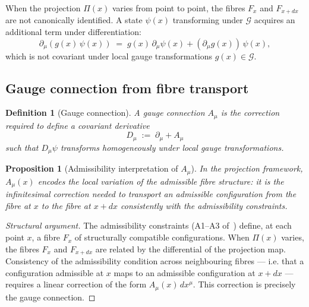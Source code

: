 \documentclass[11pt,a4paper]{article}
\newtheorem{proposition}[theorem]{Proposition}
\newtheorem{definition}[theorem]{Definition}
\begin{document}
      When the projection $\Pi(x)$ varies from point to point, the fibres
      $F_x$ and $F_{x+dx}$ are not canonically identified.
      A state $\psi(x)$ transforming under $\mathcal{G}$ acquires an additional
      term under differentiation:
      \begin{equation}
        \partial_\mu(g(x)\,\psi(x))
        \;=\; g(x)\,\partial_\mu\psi(x) + (\partial_\mu g(x))\,\psi(x),
      \end{equation}
      which is not covariant under local gauge transformations $g(x) \in \mathcal{G}$.

    \subsection{Gauge connection from fibre transport}

      \begin{definition}[Gauge connection]
        \label{def:connection}
        A \emph{gauge connection} $A_\mu$ is the correction required to define a
        covariant derivative
        \begin{equation}
          \label{eq:covariant-derivative}
          D_\mu \;:=\; \partial_\mu + A_\mu
        \end{equation}
        such that $D_\mu\psi$ transforms homogeneously under local gauge
        transformations.
      \end{definition}

      \begin{proposition}[Admissibility interpretation of $A_\mu$]
        \label{prop:connection-admissibility}
        In the projection framework, $A_\mu(x)$ encodes the local variation of the
        admissible fibre structure: it is the infinitesimal correction needed to
        transport an admissible configuration from the fibre at $x$ to the fibre
        at $x + dx$ consistently with the admissibility constraints.
      \end{proposition}

      \begin{proof}[Structural argument]
        The admissibility constraints (A1--A3 of~\cite{FoundationM}) define, at each
        point $x$, a fibre $F_x$ of structurally compatible configurations.
        When $\Pi(x)$ varies, the fibres $F_x$ and $F_{x+dx}$ are related by the
        differential of the projection map.
        Consistency of the admissibility condition across neighbouring fibres —
        i.e. that a configuration admissible at $x$ maps to an admissible configuration
        at $x+dx$ — requires a linear correction of the form $A_\mu(x)\,dx^\mu$.
        This correction is precisely the gauge connection.
      \end{proof}
\end{document}
